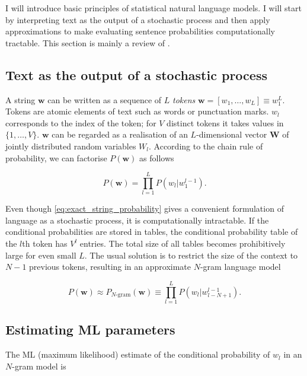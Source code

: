 \documentclass[draft]{IIBproject}
\begin{document}
I will introduce basic principles of statistical natural language models. I will start by interpreting text as the output of a stochastic process and then apply approximations to make evaluating sentence probabilities computationally tractable. This section is mainly a review of \cite{4f11:statistical_language_models, 4f11:smt_systems, coursera:nlp}.

\FloatBarrier
\subsection{Text as the output of a stochastic process}

A string $\mathbf w$ can be written as a sequence of $L$ \emph{tokens} $\mathbf w = [ w_1, \dots, w_L ] \equiv w_1^L$. Tokens are atomic elements of text such as words or punctuation marks. $w_l$ corresponds to the index of the token; for $V$ distinct tokens it takes values in $\{1, \dots, V\}$. $\mathbf w$ can be regarded as a realisation of an $L$-dimensional vector $\mathbf W$ of jointly distributed random variables $W_l$. According to the chain rule of probability, we can factorise $P(\mathbf w)$ as follows

\begin{equation}
\label{eq:exact_string_probability}
P(\mathbf w) = \prod_{l=1}^{L} P( w_l | w_1^{l-1} ) .
\end{equation}

Even though \cref{eq:exact_string_probability} gives a convenient formulation of language as a stochastic process, it is computationally intractable. If the conditional probabilities are stored in tables, the conditional probability table of the $l$th token has $V^l$ entries. The total size of all tables becomes prohibitively large for even small $L$. The usual solution is to restrict the size of the context to $N{-}1$ previous tokens, resulting in an approximate $N$-gram language model

\begin{equation}
\label{eq:ngram_string_probability}
P(\mathbf w) \approx P_{\text{$N$-gram}}(\mathbf w) \equiv \prod_{l=1}^{L} P( w_l | w_{l-N+1}^{l-1} ).
\end{equation}

\FloatBarrier
\subsection{Estimating ML parameters}

The ML (maximum likelihood) estimate of the conditional probability of $w_l$ in an $N$-gram model is
\end{document}
